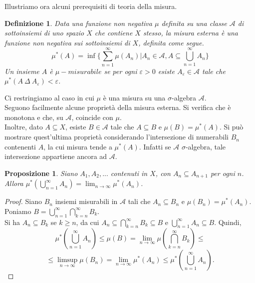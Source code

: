 \documentclass[a4paper, twoside]{article}
\newcommand{\A}{\mathcal{A}}
\newcommand{\<}{\langle}
\renewcommand{\>}{\rangle}
\newtheorem{defin}[teo]{Definizione}
\newtheorem{prop}[teo]{Proposizione}
\begin{document}
	Illustriamo ora alcuni prerequisiti di teoria della misura.
	\begin{defin}
		Data una funzione non negativa $\mu$ definita su una classe $\mathcal{A}$ di sottoinsiemi di uno spazio $X$ che contiene $X$ stesso, la misura esterna è una funzione non negativa sui sottoinsiemi di $X$, definita come segue.
		$$ \mu^*(A) = \inf \bigg\{ \sum_{n=1}^{\infty} \mu (A_n) | A_n \in \mathcal{A}, A \subseteq \bigcup_{n=1}^{\infty} A_n \bigg\} $$
		Un insieme $A$ è $\mu-misurabile$ se per ogni $\varepsilon > 0$ esiste $A_{\varepsilon} \in \mathcal{A}$ tale che $\mu^*(A \ \Delta \ A_{\varepsilon}) < \varepsilon$.
	\end{defin}
	Ci restringiamo al caso in cui $\mu$ è una misura su una $\sigma$-algebra $\mathcal{A}$.\\
	Seguono facilmente alcune proprietà della misura esterna. Si verifica che è monotona e che, su $\A$, coincide con $\mu$.\\
	Inoltre, dato $A \subseteq X$, esiste $B \in \A$ tale che $A \subseteq B$ e $\mu(B)=\mu^*(A)$. Si può mostrare quest'ultima proprietà considerando l'intersezione di numerabili $B_n$ contenenti $A$, la cui misura tende a $\mu^*(A)$. Infatti se $\A$ $\sigma$-algebra, tale intersezione appartiene ancora ad $\A$.
	
	\begin{prop}
		Siano $A_1, A_2, ...$ contenuti in $X$, con $A_{n} \subseteq A_{n+1}$ per ogni $n$. Allora 
		$	\mu^{*}\left(\bigcup_{n=1}^{\infty} A_{n}\right)=\lim _{n \rightarrow \infty} \mu^{*}\left(A_{n}\right)	$.
	\end{prop} 
	\begin{proof}
		Siano $B_{n}$ insiemi misurabili in $\A$ tali che $A_{n} \subseteq B_{n}$ e $\mu\left(B_{n}\right)=\mu^{*}\left(A_{n}\right)$. Poniamo 
		$ B=\bigcup_{n=1}^{\infty} \bigcap_{k=n}^{\infty} B_{k} \text {. }$\\
		Si ha $A_{n} \subseteq B_{k}$ se $k \geq n$, da cui $A_{n} \subseteq \bigcap_{k=n}^\infty B_k \subseteq B$ e $\bigcup_{n=1}^{\infty} A_{n} \subseteq B$. Quindi,	$$ \mu^{*}\left(\textstyle\bigcup_{n=1}^{\infty} A_{n}\right) \leq \mu(B)=\lim _{n \rightarrow \infty} \mu\left(\textstyle\bigcap_{k=n}^{\infty} B_{k}\right) \leq$$ 
		$$\leq \limsup _{n \rightarrow \infty} \mu\left(B_{n}\right)=\lim _{n \rightarrow \infty} \mu^{*}\left(A_{n}\right) \leq \mu^{*}\left(\textstyle\bigcup_{n=1}^{\infty} A_{n}\right).$$
	\end{proof}
\end{document}
